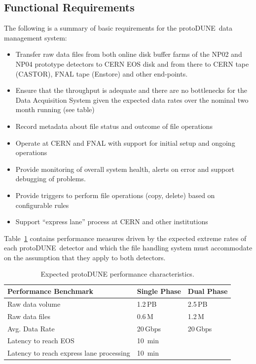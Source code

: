 \documentclass[pdftex,12pt,letter]{article}
\newcommand{\pd}{protoDUNE\ }
\begin{document}
\subsection{Functional Requirements}

The following is a summary of basic requirements for the \pd data management system:
\begin{itemize}

\item Transfer raw data files from both online disk buffer farms of the NP02 and NP04 prototype detectors
to CERN EOS disk and from there to CERN tape (CASTOR), FNAL tape (Enstore) and other end-points.

\item Ensure that the throughput is adequate and there are no bottlenecks for the Data Acquisition System given the expected data rates over the nominal two month running (see table)

\item Record metadata about file status and outcome of file operations

\item Operate at CERN and FNAL with support for initial setup and ongoing operations

\item Provide monitoring of overall system health, alerts on error and support debugging of problems.

\item Provide triggers to perform file operations (copy, delete) based on configurable rules

\item Support ``express lane'' process at CERN and other institutions

\end{itemize}

\noindent
Table~\ref{fig:det_perf} contains performance measures driven by the expected extreme rates of each \pd detector
and which the file handling system must accommodate on the assumption that they apply to both detectors.


\begin{table}[tbh]
\centering
\begin{tabular}{l l l}
\hline
\textbf{Performance Benchmark} & \textbf{Single Phase} & \textbf{Dual Phase}\\
\hline
\hline
Raw data volume                          & 1.2\,PB & 2.5\,PB \\
Raw data files                          & 0.6\,M  & 1.2\,M\\
Avg. Data Rate                                & 20\,Gbps & 20\,Gbps \\
Latency to reach EOS                     & 10~min & \\
Latency to reach express lane processing & 10~min &\\
\hline
\end{tabular}
\caption{\label{fig:det_perf}Expected protoDUNE performance characteristics.}
\end{table}
\end{document}
